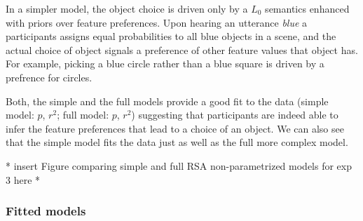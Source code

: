 \documentclass[10pt,a4paper]{article}
\begin{document}
In a simpler model, the object choice is driven only by a $L_0$ semantics enhanced with priors over feature preferences. Upon hearing an utterance \textit{blue} a participants assigns equal probabilities to all blue objects in a scene, and the actual choice of object signals a preference of other feature values that object has. For example, picking a blue circle rather than a blue square is driven by a prefrence for circles.

Both, the simple and the full models provide a good fit to the data (simple model: $p$, $r^2$; full model: $p$, $r^2$) suggesting that participants are indeed able to infer the feature preferences that lead to a choice of an object. We can also see that the simple model fits the data just as well as the full more complex model.

* insert Figure comparing simple and full RSA non-parametrized models for exp 3 here *

\subsubsection{Fitted models}
\end{document}

